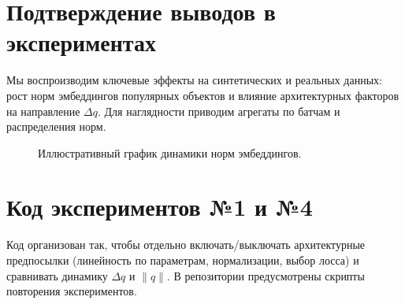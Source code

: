 \section{Подтверждение выводов в экспериментах}
Мы воспроизводим ключевые эффекты на синтетических и реальных данных: рост норм эмбеддингов популярных объектов и влияние архитектурных факторов на направление \(\Delta q\). Для наглядности приводим агрегаты по батчам и распределения норм.

\begin{figure}[t]
  \centering
  \fbox{\rule{0pt}{30mm}\rule{40mm}{0pt}}
  \caption{Иллюстративный график динамики норм эмбеддингов.}
\end{figure}

\section{Код экспериментов №1 и №4}
Код организован так, чтобы отдельно включать/выключать архитектурные предпосылки (линейность по параметрам, нормализации, выбор лосса) и сравнивать динамику \(\Delta q\) и \(\|q\|\). В репозитории предусмотрены скрипты повторения экспериментов.
